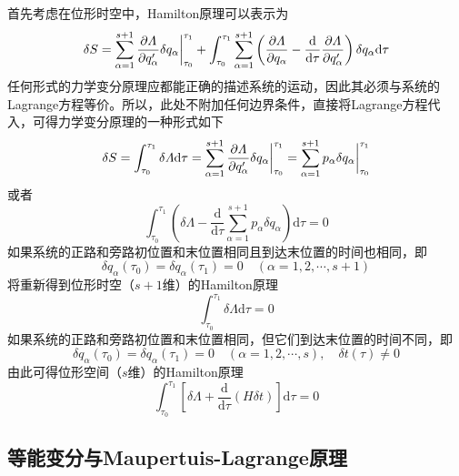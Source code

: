 首先考虑在位形时空中，Hamilton原理可以表示为
\begin{equation*}
	\delta S = \sum_{\alpha=1}^{s+1} \frac{\partial \mathnormal{\Lambda}}{\partial q'_\alpha} \delta q_\alpha\bigg|_{\tau_0}^{\tau_1} + \int_{\tau_0}^{\tau_1} \sum_{\alpha=1}^{s+1} \left(\frac{\partial \mathnormal{\Lambda}}{\partial q_\alpha} - \frac{\mathrm{d}}{\mathrm{d} \tau} \frac{\partial \mathnormal{\Lambda}}{\partial q'_\alpha}\right) \delta q_\alpha \mathrm{d} \tau
\end{equation*}
任何形式的力学变分原理应都能正确的描述系统的运动，因此其必须与系统的Lagrange方程等价。所以，此处不附加任何边界条件，直接将Lagrange方程代入，可得力学变分原理的一种形式如下
\begin{equation}
	\delta S = \int_{\tau_0}^{\tau_1} \delta \varLambda \mathrm{d} \tau = \sum_{\alpha=1}^{s+1} \frac{\partial \mathnormal{\Lambda}}{\partial q'_\alpha} \delta q_\alpha\bigg|_{\tau_0}^{\tau_1} = \sum_{\alpha=1}^{s+1} p_\alpha \delta q_\alpha\bigg|_{\tau_0}^{\tau_1}
\end{equation}
或者
\begin{equation}
	\int_{\tau_0}^{\tau_1} \left(\delta \varLambda - \frac{\mathrm{d}}{\mathrm{d} \tau} \sum_{\alpha=1}^{s+1} p_\alpha \delta q_\alpha \right) \mathrm{d} \tau = 0
\end{equation}
如果系统的正路和旁路初位置和末位置相同且到达末位置的时间也相同，即
\begin{equation*}
	\delta q_\alpha(\tau_0) = \delta q_\alpha(\tau_1) = 0 \quad (\alpha = 1,2,\cdots,s+1)
\end{equation*}
将重新得到位形时空（$s+1$维）的Hamilton原理
\begin{equation}
	\int_{\tau_0}^{\tau_1} \delta \varLambda \mathrm{d} \tau = 0
	\label{位形时空的Hamilton原理}
\end{equation}
如果系统的正路和旁路初位置和末位置相同，但它们到达末位置的时间不同，即
\begin{equation*}
	\delta q_\alpha(\tau_0) = \delta q_\alpha(\tau_1) = 0 \quad (\alpha = 1,2,\cdots,s),\quad \delta t(\tau) \neq 0
\end{equation*}
由此可得位形空间（$s$维）的Hamilton原理
\begin{equation}
	\int_{\tau_0}^{\tau_1} \left[\delta \varLambda + \frac{\mathrm{d}}{\mathrm{d} \tau}(H\delta t)\right] \mathrm{d} \tau = 0
	\label{位形空间的Hamilton原理}
\end{equation}

\subsection{等能变分与Maupertuis-Lagrange原理}

